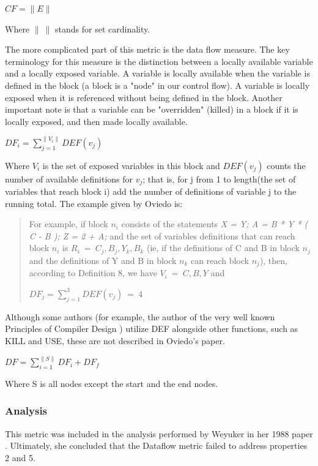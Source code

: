 \documentclass[]{article}
\begin{document}
$CF=\parallel E\parallel$

Where $\parallel ~\parallel$ stands for set cardinality.

The more complicated part of this metric is the data flow measure.
The key terminology for this measure is the distinction between a locally available variable and a locally exposed variable.
A variable is locally available when the variable is defined in the block (a block is a "node" in our control flow).
A variable is locally exposed when it is referenced without being defined in the block.
Another important note is that a variable can be "overridden" (killed) in a block if it is locally exposed, and then made locally available.

$DF_i = \sum\limits_{j=1}^{\parallel V_i \parallel} DEF(v_j)$

Where $V_i$ is the set of exposed variables in this block and $DEF(v_j)$ counts the number of available definitions for $v_j$; that is, for j from 1 to length(the set of variables that reach block i) add the number of definitions of variable j to the running total.
The example given by Oviedo is:
\begin{quotation}
	For example, if block $n_i$ consists of the statements \textit{X = Y; A = B * Y * ( C - B ); Z = 2 + A;} and the set of variables definitions that can reach block $n_i$ is $R_i ~= ~{C_j, B_j, Y_k, B_k}$ (ie, if the definitions of C and B in block $n_j$ and the definitions of Y and B in block $n_k$ can reach block $n_j$), then, according to Definition 8, we have $V_i ~= ~{C,B,Y}$ and
	
	$DF_j = \sum\limits_{j=1}^{3} DEF(v_j)~=~4$
\end{quotation}

Although some authors (for example, the author of the very well known Principles of Compiler Design \cite{aho1977principles}) utilize DEF alongside other functions, such as KILL and USE, these are not described in Oviedo's paper.

$DF = \sum\limits_{i=1}^{\parallel S \parallel} DF_i+DF_f$

Where S is all nodes except the start and the end nodes.

\subsubsection{Analysis}

This metric was included in the analysis performed by Weyuker in her 1988 paper \cite{ref:evaluating_software_complexity_measures}.
Ultimately, she concluded that the Dataflow metric failed to address properties 2 and 5.
\end{document}
